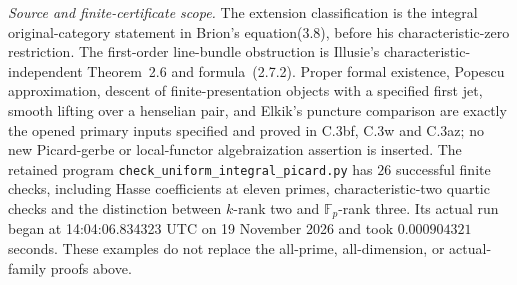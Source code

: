 \emph{Source and finite-certificate scope.}
The extension classification is the integral original-category
statement in Brion's equation(3.8), before his characteristic-zero
restriction. The first-order line-bundle obstruction is Illusie's
characteristic-independent Theorem~2.6 and formula~(2.7.2). Proper formal
existence, Popescu approximation, descent of finite-presentation
objects with a specified first jet, smooth lifting over a henselian
pair, and Elkik's puncture comparison are exactly the opened primary
inputs specified and proved in C.3bf, C.3w and C.3az; no new
Picard-gerbe or local-functor algebraization assertion is inserted.
The retained program \texttt{check\_uniform\_integral\_picard.py}
has $26$ successful finite checks, including Hasse coefficients at
eleven primes, characteristic-two quartic checks and the distinction
between $k$-rank two and $\mathbb F_p$-rank three. Its actual run began
at 14:04:06.834323 UTC on 19 November 2026 and took
$0.000904321$ seconds. These examples do not replace the all-prime,
all-dimension, or actual-family proofs above.
